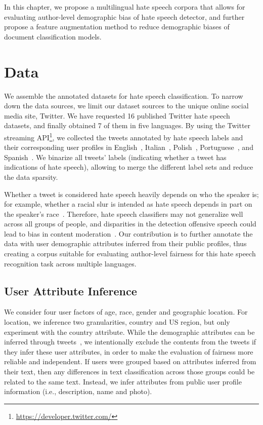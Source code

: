 In this chapter, we propose a multilingual hate speech corpora that allows for evaluating author-level demographic bias of hate speech detector, and further propose a feature augmentation method to reduce demographic biases of document classification models.


\section{Data}
\label{chap5:sec:mul_data}

We assemble the annotated datasets for hate speech classification.
To narrow down the data sources, we limit our dataset sources to the unique online social media site, Twitter.
We have requested 16 published Twitter hate speech datasets, and finally obtained 7 of them in five languages.
By using the Twitter streaming API\footnote{\url{https://developer.twitter.com/}}, we collected the tweets annotated by hate speech labels and their corresponding user profiles in English~\cite{waseem2016hateful, waseem2016you,founta2018large}, Italian~\cite{sanguinetti2018italian}, Polish~\cite{ptaszynski2017learning}, Portuguese~\cite{fortuna2019hierarchically}, and Spanish~\cite{basile2019semeval}.
We binarize all tweets' labels (indicating whether a tweet has indications of hate speech), allowing to merge the different label sets and reduce the data sparsity.

Whether a tweet is considered hate speech heavily depends on who the speaker is; for example, whether a racial slur is intended as hate speech depends in part on the speaker's race~\cite{waseem2016hateful}.
Therefore, hate speech classifiers may not generalize well across all groups of people, and disparities in the detection offensive speech could lead to bias in content moderation~\cite{shen2018perception}.
Our contribution is to further annotate the data with user demographic attributes inferred from their public profiles,
thus creating a corpus suitable for evaluating author-level fairness for this hate speech recognition task across multiple languages.

\subsection{User Attribute Inference}
\label{chap5:subsec:infer}

We consider four user factors of age, race, gender and geographic location. For location, we inference two granularities, country and US region, but only experiment with the country attribute.
While the demographic attributes can be inferred through tweets~\cite{volkova2015inferring,davidson2019racial},
we intentionally exclude the contents from the tweets if they infer these user attributes, in order to make the evaluation of fairness more reliable and independent.
If users were grouped based on attributes inferred from their text, then any differences in text classification across those groups could be related to the same text. 
Instead, we infer attributes from public user profile information (i.e., description, name and photo).

